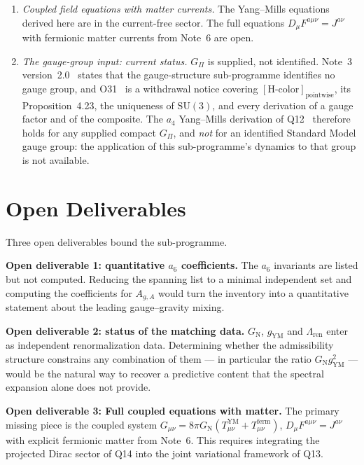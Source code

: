 \documentclass[11pt,a4paper]{article}
\theoremstyle{definition}
\newcommand{\SU}{\mathrm{SU}}
\newcommand{\GN}{G_{\mathrm{N}}}
\newcommand{\gYM}{g_{\mathrm{YM}}}
\newcommand{\Gpi}{G_\Pi}
\begin{document}
\begin{enumerate}
        \item \textit{Coupled field equations with matter currents.}
        The Yang--Mills equations derived here are in the current-free sector.
        The full equations $D_\mu F^{a\mu\nu} = J^{a\nu}$ with fermionic matter currents from
        Note~6 are open.

        \item \textit{The gauge-group input: current status.}
        $\Gpi$ is supplied, not identified.
        Note~3 version~2.0~\cite{Beau2026gsnote} states that the gauge-structure sub-programme
        identifies no gauge group, and O31~\cite{Beau2026a35} is a withdrawal notice covering
        $[\mathrm{H\text{-}color}]_{\mathrm{pointwise}}$, its Proposition~4.23, the uniqueness of
        $\SU(3)$, and every derivation of a gauge factor and of the composite.
        The $a_4$ Yang--Mills derivation of Q12~\cite{Beau2026q12} therefore holds for any
        supplied compact $\Gpi$, and \emph{not} for an identified Standard Model gauge group:
        the application of this sub-programme's dynamics to that group is not available.
      \end{enumerate}

  \section{Open Deliverables}
    \label{sec:open}

    Three open deliverables bound the sub-programme.

    \textbf{Open deliverable 1: quantitative $a_6$ coefficients.}
    The $a_6$ invariants are listed but not computed. Reducing the spanning list to a minimal
    independent set and computing the coefficients for $A_{g,A}$ would turn the inventory into a
    quantitative statement about the leading gauge--gravity mixing.

    \textbf{Open deliverable 2: status of the matching data.}
    $\GN$, $\gYM$ and $\Lambda_{\mathrm{ren}}$ enter as independent renormalization data.
    Determining whether the admissibility structure constrains any combination of them --- in
    particular the ratio $\GN\gYM^2$ --- would be the natural way to recover a predictive content
    that the spectral expansion alone does not provide.

    \textbf{Open deliverable 3: Full coupled equations with matter.}
    The primary missing piece is the coupled system
    $G_{\mu\nu} = 8\pi\GN(T^{\mathrm{YM}}_{\mu\nu} + T^{\mathrm{ferm}}_{\mu\nu})$,
    $D_\mu F^{a\mu\nu} = J^{a\nu}$
    with explicit fermionic matter from Note~6.
    This requires integrating the projected Dirac sector of Q14 into the joint variational
    framework of Q13.
\end{document}
